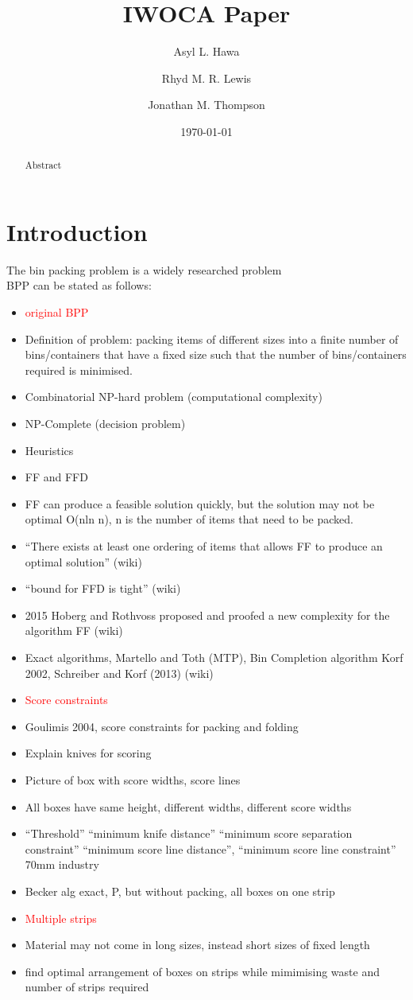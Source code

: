 \documentclass{llncs}
\title{IWOCA Paper}
\author{Asyl L. Hawa \and Rhyd M. R. Lewis \and Jonathan M. Thompson}
\institute{School of Mathematics, Cardiff University, Senghennydd Road, Cardiff, UK, CF24 4AG}
\date{\today}
\begin{document}
\maketitle

\begin{abstract}
	Abstract
\end{abstract}

\section{Introduction}

The bin packing problem is a widely researched problem\\
BPP can be stated as follows:

\begin{itemize}
	\item \textcolor{red}{original BPP}
	\item Definition of problem: packing items of different sizes into a finite number of bins/containers that have a fixed size such that the number of bins/containers required is minimised.
	\item Combinatorial NP-hard problem (computational complexity)
	\item NP-Complete (decision problem)
	\item Heuristics
	\item FF and FFD
	\item FF can produce a feasible solution quickly, but the solution may not be optimal O(nln n), n is the number of items that need to be packed.
	\item ``There exists at least one ordering of items that allows FF to produce an optimal solution'' (wiki)
	\item ``bound for FFD is tight'' (wiki)
	\item 2015 Hoberg and Rothvoss proposed and proofed a new complexity for the algorithm FF (wiki)
	\item Exact algorithms, Martello and Toth (MTP), Bin Completion algorithm Korf 2002, Schreiber and Korf (2013) (wiki)
	
	\item \textcolor{red}{Score constraints}	
	\item Goulimis 2004, score constraints for packing and folding
	\item Explain knives for scoring
	\item Picture of box with score widths, score lines
	\item All boxes have same height, different widths, different score widths
	\item ``Threshold'' ``minimum knife distance'' ``minimum score separation constraint'' ``minimum score line distance'', ``minimum score line constraint'' 70mm industry
	\item Becker alg exact, P, but without packing, all boxes on one strip
	\item \textcolor{red}{Multiple strips}
	\item Material may not come in long sizes, instead short sizes of fixed length
	\item find optimal arrangement of boxes on strips while mimimising waste and number of strips required
	

\end{itemize}
\end{document}

